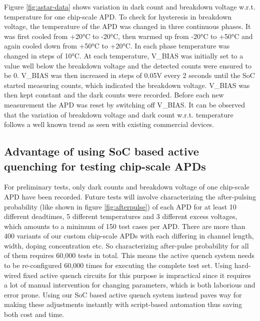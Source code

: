 Figure \ref{fig:astar-data} shows variation in dark count and breakdown voltage w.r.t. temperature for one chip-scale APD. To check for hysteresis in breakdown voltage, the temperature of the APD was changed in three continuous phases. It was first cooled from +20°C to -20°C, then warmed up from -20°C to +50°C and again cooled down from +50°C to +20°C. In each phase temperature was changed in steps of 10°C. At each temperature, V\_BIAS was initially set to a value well below the breakdown voltage and the detected counts were ensured to be 0. V\_BIAS was then increased in steps of 0.05V every 2 seconds until the SoC started measuring counts, which indicated the breakdown voltage. V\_BIAS was then kept constant and the dark counts were recorded. Before each new measurement the APD was reset by switching off V\_BIAS. 
It can be observed that the variation of breakdown voltage and dark count w.r.t. temperature follows a well known trend as seen with existing commercial devices.

\subsection{Advantage of using SoC based active quenching for testing chip-scale APDs}
For preliminary tests, only dark counts and breakdown voltage of one chip-scale APD have been recorded. Future tests will involve characterizing the after-pulsing probability (like shown in figure \ref{fig:afterpulse}) of each APD for at least 10 different deadtimes, 5 different temperatures and 3 different excess voltages, which amounts to a minimum of 150 test cases per APD. There are more than 400 variants of our custom chip-scale APDs with each differing in channel length, width, doping concentration etc. So characterizing after-pulse probability for all of them requires 60,000 tests in total. This means the active quench system needs to be re-configured 60,000 times for executing the complete test set. Using hard-wired fixed active quench circuits for this purpose is impractical since it requires a lot of manual intervention for changing parameters, which is both laborious and error prone. Using our SoC based active quench system instead paves way for making these adjustments instantly with script-based automation thus saving both cost and time.

